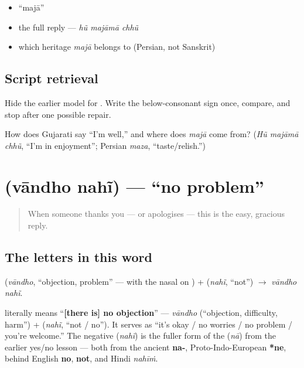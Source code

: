 \begin{itemize}
\raggedright
  \item \textquotedblleft{}majā\textquotedblright{}
  \item the full reply — \emph{hũ majāmā chhũ}
  \item which heritage \emph{majā} belongs to (Persian, not Sanskrit)
\end{itemize}

\subsection*{Script retrieval}
Hide the earlier model for \textbf{}. Write the below-consonant sign once, compare, and stop after one possible repair.

\begin{tcolorbox}[breakable,colback=teal!4,colframe=teal!35!black,title={Before you move on}]
How does Gujarati say \textquotedblleft{}I'm well,\textquotedblright{} and where does \emph{majā} come from? (\emph{Hũ majāmā chhũ}, \textquotedblleft{}I'm in enjoyment\textquotedblright{}; Persian \emph{maza}, \textquotedblleft{}taste/relish.\textquotedblright{})
\end{tcolorbox}
\section[\gu{વાંધો} \gu{નહીં}]{  (vāndho nahĩ) — \textquotedblleft{}no problem\textquotedblright{}}

\label{lesson:GU-C03-vandho-nahi}



\begin{quote}
When someone thanks you — or apologises — this is the easy, gracious reply.
\end{quote}

\subsection*{The letters in this word}
\textbf{} (\emph{vāndho}, \textquotedblleft{}objection, problem\textquotedblright{} — with the nasal on \textbf{}) + \textbf{} (\emph{nahĩ}, \textquotedblleft{}not\textquotedblright{}) $\to$ \emph{vāndho nahĩ}.

\begin{cousinweb}
\textbf{ } literally means \textquotedblleft{}\textbf{{[}there is{]} no objection}\textquotedblright{} — \emph{vāndho} (\textquotedblleft{}objection, difficulty, harm\textquotedblright{}) + \textbf{} (\emph{nahĩ}, \textquotedblleft{}not / no\textquotedblright{}). It serves as \textquotedblleft{}it's okay / no worries / no problem / you're welcome.\textquotedblright{} The negative \textbf{} (\emph{nahĩ}) is the fuller form of the \textbf{} (\emph{nā}) from the earlier yes/no lesson — both from the ancient \textbf{na-}, Proto-Indo-European \textbf{*ne}, behind English \textbf{no}, \textbf{not}, and Hindi \emph{nahīṁ}.
\end{cousinweb}

